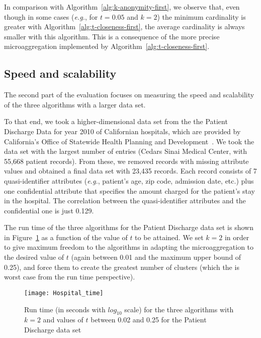 \documentclass[10pt,journal,compsoc]{IEEEtran}
\theoremstyle{definition}
\theoremstyle{plain}
\begin{document}
In comparison with Algorithm~\ref{alg:k-anonymity-first}, we observe that,
even though in some cases ({\em e.g.}, for $t=0.05$ and $k=2$) the minimum
cardinality is greater with Algorithm~\ref{alg:t-closeness-first}, 
the average cardinality is always smaller with this algorithm.
This is a consequence of the more precise 
microaggregation implemented by Algorithm~\ref{alg:t-closeness-first}.

\subsection{Speed and scalability}
\label{perform}

The second part of the evaluation focuses on measuring the speed
and scalability of the three algorithms with a larger data set.

To that end, we took a higher-dimensional data set from the 
the Patient Discharge Data for year 2010 of Californian hospitals,
which are provided by 
California's Office of Statewide Health Planning and Development~\cite{oshpd}. 
We took the data set with the largest number of entries
(Cedars Sinai Medical Center, with 55,668 patient records). 
From these, we removed records with missing attribute values and 
obtained a final data set with 23,435 records. Each record
consists of 7 quasi-identifier attributes ({\em e.g.}, patient's age, zip code, admission date, etc.)
plus one confidential attribute that specifies the amount charged
for the patient's stay in the hospital. The correlation
between the quasi-identifier attributes and the confidential one is just 0.129.

The run time of the three algorithms for the Patient Discharge data set is shown in
Figure~\ref{fig:time} as a function of the value of $t$ to be attained.
We set $k=2$ in order to give maximum freedom to the algorithms in 
adapting the microaggregation to the desired value of $t$ (again between 0.01 and 
the maximum upper bound of 0.25), and force them to create the greatest
number of clusters (which the is worst case from the run time perspective).


\begin{figure}[!t]
	\centering
	\texttt{[image: Hospital\_time]}
	\protect\caption{Run time (in seconds with $log_{10}$ scale) for the three algorithms with $k=2$ 
and values of $t$	between 0.02 and 0.25 for the Patient Discharge data set\label{fig:time}}
\end{figure}
\end{document}
